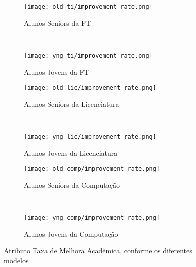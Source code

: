 \clearpage
\begin{figure}[!ht]
    \centering
    \begin{subfigure}[b]{0.48\textwidth}
        \centering
        \texttt{[image: old\_ti/improvement\_rate.png]}
        \caption{Alunos Seniors da FT}
    \end{subfigure}
    ~
    \begin{subfigure}[b]{0.48\textwidth}
        \centering
        \texttt{[image: yng\_ti/improvement\_rate.png]}
        \caption{Alunos Jovens da FT}
    \end{subfigure}

    \begin{subfigure}[b]{0.48\textwidth}
        \centering
        \texttt{[image: old\_lic/improvement\_rate.png]}
        \caption{Alunos Seniors da Licenciatura}
    \end{subfigure}
    ~
    \begin{subfigure}[b]{0.48\textwidth}
        \centering
        \texttt{[image: yng\_lic/improvement\_rate.png]}
        \caption{Alunos Jovens da Licenciatura}
    \end{subfigure}

    \begin{subfigure}[b]{0.48\textwidth}
        \centering
        \texttt{[image: old\_comp/improvement\_rate.png]}
        \caption{Alunos Seniors da Computação}
    \end{subfigure}
    ~
    \begin{subfigure}[b]{0.48\textwidth}
        \centering
        \texttt{[image: yng\_comp/improvement\_rate.png]}
        \caption{Alunos Jovens da Computação}
    \end{subfigure}
    \caption{Atributo Taxa de Melhora Acadêmica, conforme os diferentes modelos}
\end{figure}

